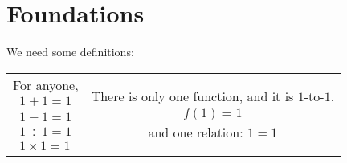 \setcounter{section}{0}

\section{Foundations}
We need some definitions:
\begin{center}
  \begin{tabular}{cc}
    \begin{minipage}{0.4\textwidth}
      For anyone,
      \begin{align*}
        1+1=1\\
        1-1=1\\
        1 \div 1=1\\
        1\times 1=1
      \end{align*}
    \end{minipage}
    &
    \begin{minipage}{0.4\textwidth}
      There is only one function, and it is $1$-to-$1$.
      \begin{align*}
        f(1) = 1
      \end{align*}
      and one relation: $1=1$
    \end{minipage}
  \end{tabular}
\end{center}
